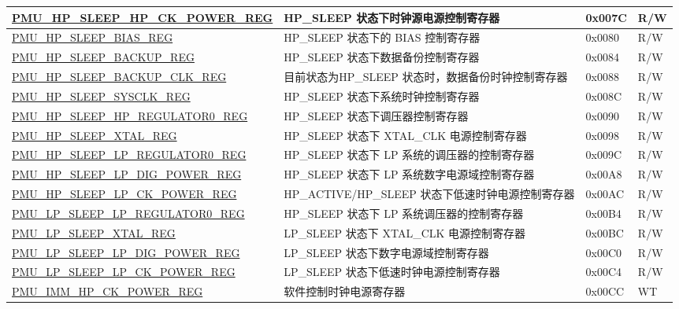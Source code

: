 \begin{longtable}{ | l | L{6cm} | l | l | }
\hyperref[regdesc:PMUHPSLEEPHPCKPOWERREG]{PMU\_HP\_SLEEP\_HP\_CK\_POWER\_REG} & HP\_SLEEP 状态下时钟源电源控制寄存器& 0x007C & R/W \\ \hline
\hyperref[regdesc:PMUHPSLEEPBIASREG]{PMU\_HP\_SLEEP\_BIAS\_REG} & HP\_SLEEP 状态下的 BIAS 控制寄存器 & 0x0080 & R/W \\ \hline
\hyperref[regdesc:PMUHPSLEEPBACKUPREG]{PMU\_HP\_SLEEP\_BACKUP\_REG} & HP\_SLEEP 状态下数据备份控制寄存器& 0x0084 & R/W \\ \hline
\hyperref[regdesc:PMUHPSLEEPBACKUPCLKREG]{PMU\_HP\_SLEEP\_BACKUP\_CLK\_REG} & 目前状态为HP\_SLEEP 状态时，数据备份时钟控制寄存器 & 0x0088 & R/W \\ \hline
\hyperref[regdesc:PMUHPSLEEPSYSCLKREG]{PMU\_HP\_SLEEP\_SYSCLK\_REG} & HP\_SLEEP 状态下系统时钟控制寄存器& 0x008C & R/W \\ \hline
\hyperref[regdesc:PMUHPSLEEPHPREGULATOR0REG]{PMU\_HP\_SLEEP\_HP\_REGULATOR0\_REG} & HP\_SLEEP 状态下调压器控制寄存器& 0x0090 & R/W \\ \hline
\hyperref[regdesc:PMUHPSLEEPXTALREG]{PMU\_HP\_SLEEP\_XTAL\_REG} & HP\_SLEEP 状态下 XTAL\_CLK 电源控制寄存器& 0x0098 & R/W \\ \hline
\hyperref[regdesc:PMUHPSLEEPLPREGULATOR0REG]{PMU\_HP\_SLEEP\_LP\_REGULATOR0\_REG} & HP\_SLEEP 状态下 LP 系统的调压器的控制寄存器 & 0x009C & R/W \\ \hline
\hyperref[regdesc:PMUHPSLEEPLPDIGPOWERREG]{PMU\_HP\_SLEEP\_LP\_DIG\_POWER\_REG} & HP\_SLEEP 状态下 LP 系统数字电源域控制寄存器& 0x00A8 & R/W \\ \hline
\hyperref[regdesc:PMUHPSLEEPLPCKPOWERREG]{PMU\_HP\_SLEEP\_LP\_CK\_POWER\_REG} & HP\_ACTIVE/HP\_SLEEP 状态下低速时钟电源控制寄存器& 0x00AC & R/W \\ \hline
\hyperref[regdesc:PMULPSLEEPLPREGULATOR0REG]{PMU\_LP\_SLEEP\_LP\_REGULATOR0\_REG} & HP\_SLEEP 状态下 LP 系统调压器的控制寄存器 & 0x00B4 & R/W \\ \hline
\hyperref[regdesc:PMULPSLEEPXTALREG]{PMU\_LP\_SLEEP\_XTAL\_REG} & LP\_SLEEP 状态下 XTAL\_CLK 电源控制寄存器& 0x00BC & R/W \\ \hline
\hyperref[regdesc:PMULPSLEEPLPDIGPOWERREG]{PMU\_LP\_SLEEP\_LP\_DIG\_POWER\_REG} & LP\_SLEEP 状态下数字电源域控制寄存器& 0x00C0 & R/W \\ \hline
\hyperref[regdesc:PMULPSLEEPLPCKPOWERREG]{PMU\_LP\_SLEEP\_LP\_CK\_POWER\_REG} & LP\_SLEEP 状态下低速时钟电源控制寄存器& 0x00C4 & R/W \\ \hline
\hyperref[regdesc:PMUIMMHPCKPOWERREG]{PMU\_IMM\_HP\_CK\_POWER\_REG} & 软件控制时钟电源寄存器 & 0x00CC & WT \\ \hline

\end{longtable}

